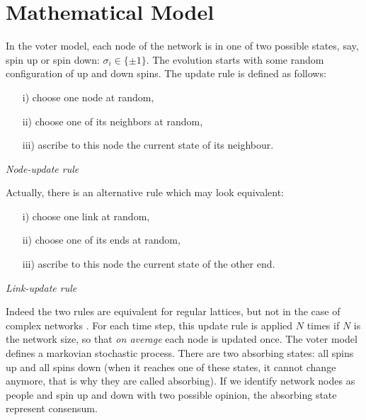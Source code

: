 \section{Mathematical Model}
In the voter model, each node of the network is in one of two possible states, say, spin up or spin down: $\sigma_i \in \{\pm 1\}$. The evolution starts with some random configuration of up and down spins. The update rule is defined as follows: 
\medskip
\newline
\begin{minipage}{0.8\textwidth}
\begin{itemize}
    \item[i)] choose one node at random,
    \item[ii)] choose one of its neighbors at random,
    \item[iii)] ascribe to this node the current state of its neighbour.
\end{itemize}
\end{minipage}
\hfill
\begin{minipage}{0.2\textwidth}
\vfill
    \textit{Node-update rule}
\vfill
\end{minipage}
\medskip
\newline
Actually, there is an alternative rule which may look equivalent:
\medskip
\newline
\begin{minipage}{0.8\textwidth}
\begin{itemize}
    \item[i)] choose one link at random,
    \item[ii)] choose one of its ends at random,
    \item[iii)] ascribe to this node the current state of the other end.
\end{itemize}
\end{minipage}
\hfill
\begin{minipage}{0.2\textwidth}
\vfill
    \textit{Link-update rule}
\vfill
\end{minipage}
\medskip
\newline
Indeed the two rules are equivalent for regular lattices, but not in the case of complex networks \cite{suchecki_analitical}. For each time step, this update rule is applied $N$ times if $N$ is the network size, so that \textit{on average} each node is updated once. The voter model defines a markovian stochastic process. There are two absorbing states: all spins up and all spins down (when it reaches one of these states, it cannot change anymore, that is why they are called absorbing). If we identify network nodes as people and spin up and down with two possible opinion, the absorbing state represent consensum. \\
